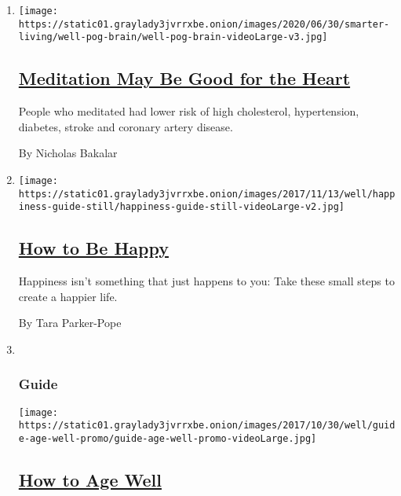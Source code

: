 \begin{enumerate}
\def\labelenumi{\arabic{enumi}.}
\item
  \texttt{[image: https://static01.graylady3jvrrxbe.onion/images/2020/06/30/smarter-living/well-pog-brain/well-pog-brain-videoLarge-v3.jpg]}

  \hypertarget{meditation-may-be-good-for-the-heart}{%
  \subsection{\texorpdfstring{\href{/2020/07/22/well/mind/meditation-may-be-good-for-the-heart.html}{Meditation
  May Be Good for the
  Heart}}{Meditation May Be Good for the Heart}}\label{meditation-may-be-good-for-the-heart}}

  People who meditated had lower risk of high cholesterol, hypertension,
  diabetes, stroke and coronary artery disease.

  By Nicholas Bakalar
\item
  \texttt{[image: https://static01.graylady3jvrrxbe.onion/images/2017/11/13/well/happiness-guide-still/happiness-guide-still-videoLarge-v2.jpg]}

  \hypertarget{how-to-be-happy}{%
  \subsection{\texorpdfstring{\href{/interactive/2017/well/mind/well-happiness-guide.html}{How
  to Be Happy}}{How to Be Happy}}\label{how-to-be-happy}}

  Happiness isn't something that just happens to you: Take these small
  steps to create a happier life.

  By Tara Parker-Pope
\item ~
  \hypertarget{guide}{%
  \subsubsection{Guide}\label{guide}}

  \texttt{[image: https://static01.graylady3jvrrxbe.onion/images/2017/10/30/well/guide-age-well-promo/guide-age-well-promo-videoLarge.jpg]}

  \hypertarget{how-to-age-well}{%
  \subsection{\texorpdfstring{\href{/interactive/2017/well/guide-age-well.html}{How
  to Age Well}}{How to Age Well}}\label{how-to-age-well}}


\end{enumerate}
